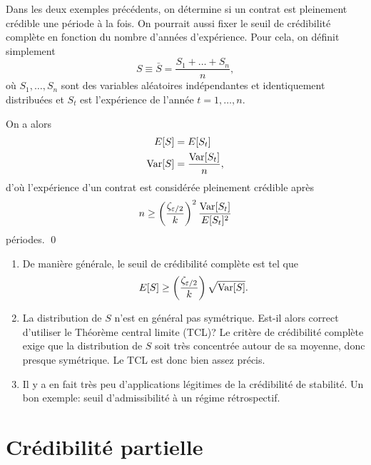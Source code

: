 \begin{exemple}
  Dans les deux exemples précédents, on détermine si un contrat est
  pleinement crédible une période à la fois. On pourrait aussi fixer
  le seuil de crédibilité complète en fonction du nombre d'années
  d'expérience. Pour cela, on définit simplement
  \begin{displaymath}
    S \equiv \bar{S} = \frac{S_1 + \dots + S_n}{n},
  \end{displaymath}
  où $S_1, \dots, S_n$ sont des variables aléatoires indépendantes et
  identiquement distribuées et $S_t$ est l'expérience de l'année $t =
  1, \dots, n$.

  On a alors
  \begin{align*}
    E [ S ] &= E [ S_t ] \\
    \operatorname{Var} [ S ] &= \frac{\operatorname{Var} [ S_t ]}{n},
  \end{align*}
  d'où l'expérience d'un contrat est considérée pleinement crédible
  après
  \begin{displaymath}
    n \geq
    \left(
      \frac{\zeta_{\varepsilon/2}}{k}
    \right)^2
    \frac{\operatorname{Var} [ S_t ]}{E [ S_t ]^2}
  \end{displaymath}
  périodes.
  \qed
\end{exemple}

\begin{rems}
  \begin{enumerate}
  \item De manière générale, le seuil de crédibilité complète est tel
    que
    \begin{displaymath}
      E [ S ] \geq
      \left(
        \frac{\zeta_{\varepsilon/2}}{k}
      \right)
      \sqrt{\operatorname{Var} [ S ]}.
    \end{displaymath}
  \item La distribution de $S$ n'est en général pas symétrique. Est-il
    alors correct d'utiliser le Théorème central limite (TCL)?  Le
    critère de crédibilité complète exige que la distribution de $S$
    soit très concentrée autour de sa moyenne, donc presque
    symétrique. Le TCL est donc bien assez précis.
  \item Il y a en fait très peu d'applications légitimes de la
    crédibilité de stabilité. Un bon exemple: seuil d'admissibilité à
    un régime rétrospectif.
  \end{enumerate}
\end{rems}


\section{Crédibilité partielle}
\label{sec:stabilite:credibilite_partielle}

